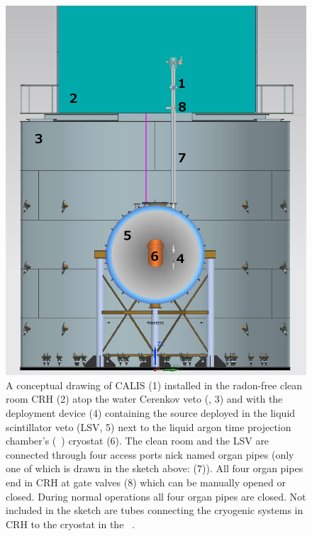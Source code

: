 \begin{figure}[htbp]
 \centering
\includegraphics[width=\textwidth]{Figures/DS50_with_CALIS}
\caption{A conceptual drawing of CALIS (1) installed in the radon-free clean room CRH (2) atop the water Cerenkov veto (\wcv, 3) and with the deployment device (4) containing the source
deployed in the liquid scintillator veto (LSV, 5) next to the liquid argon time projection chamber's (\lar\ \tpc) cryostat (6). The clean room and the LSV are connected through four access ports nick named organ pipes (only one of which is drawn in the sketch above: (7)). All four organ pipes end in CRH at gate valves (8) which can be manually opened or closed. During normal operations all four organ pipes are closed. Not included in the sketch are tubes connecting the cryogenic systems in CRH to the cryostat in the \lsv\ \cite{Agnes:2015qyz}.\label{fig:wholeAssembly_insideDetectors}\label{fig:DS50_with_CALIS}}
\end{figure}

